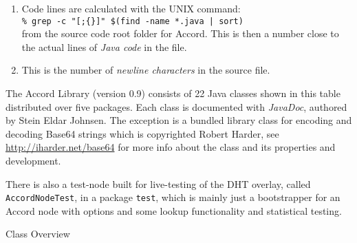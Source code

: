 \begin{table}
\parbox{.9\linewidth}{
  \footnotesize
  \begin{enumerate}
  \item Code lines are calculated with the UNIX command:\\
     {\tt \% grep -c "[;\{\}]" \$(find -name *.java | sort) }\\
     from the source code root folder for Accord.
     This is then a number close to the actual lines of \emph{Java code} in the file.
  \item This is the number of \emph{newline characters} in the source file.
  \end{enumerate}
  \small
     The Accord Library (version 0.9) consists of 22 Java classes shown in this table
     distributed over five packages. Each class is documented with \emph{JavaDoc}, authored by
     Stein Eldar Johnsen. The exception is a bundled library class for encoding and
     decoding {\sc Base64} strings which is copyrighted Robert Harder,
     see \underline{http://iharder.net/base64} for more info about the class and its
     properties and development.

     There is also a test-node built for live-testing of the DHT overlay, called
     {\tt Accord\-Node\-Test}, in a package {\tt test}, which is mainly just a bootstrapper
     for an Accord node with options and some lookup functionality and statistical testing.
}
\caption{Class Overview}\label{tab:ProjectOverview}
\end{table}



